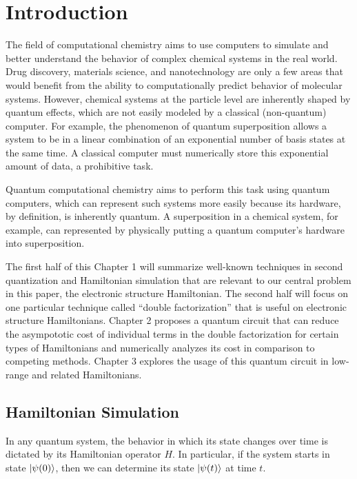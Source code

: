 

\chapter{Introduction}

The field of computational chemistry aims to use computers to simulate and better understand the behavior of complex chemical systems in the real world. Drug discovery, materials science, and nanotechnology are only a few areas that would benefit from the ability to computationally predict behavior of molecular systems. However, chemical systems at the particle level are inherently shaped by quantum effects, which are not easily modeled by a classical (non-quantum) computer. For example, the phenomenon of quantum superposition allows a system to be in a linear combination of an exponential number of basis states at the same time. A classical computer must numerically store this exponential amount of data, a prohibitive task.

Quantum computational chemistry aims to perform this task using quantum computers, which can represent such systems more easily because its hardware, by definition, is inherently quantum. A superposition in a chemical system, for example, can represented by physically putting a quantum computer's hardware into superposition.

The first half of this Chapter 1 will summarize well-known techniques in second quantization and Hamiltonian simulation that are relevant to our central problem in this paper, the electronic structure Hamiltonian. The second half will focus on one particular technique called ``double factorization'' that is useful on electronic structure Hamiltonians. Chapter 2 proposes a quantum circuit that can reduce the asympototic cost of individual terms in the double factorization for certain types of Hamiltonians and numerically analyzes its cost in comparison to competing methods. Chapter 3 explores the usage of this quantum circuit in low-range and related Hamiltonians.

\section{Hamiltonian Simulation}

In any quantum system, the behavior in which its state changes over time is dictated by its Hamiltonian operator $H$. In particular, if the system starts in state $\ket{\psi(0)}$, then we can determine its state $\ket{\psi(t)}$ at time $t$.

